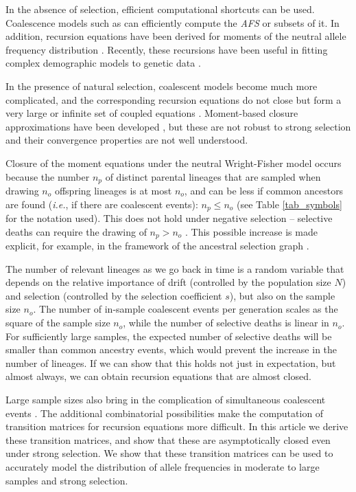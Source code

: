 \documentclass[review]{elsarticle}
\begin{document}
In the absence of selection, efficient computational shortcuts can be used. Coalescence models such
as \citep{fastsimcoal2, KammEtAl2017} can efficiently compute the \textit{AFS} or subsets of it. In
addition, recursion equations have been derived for moments of the neutral allele frequency
distribution \citep{KimuraCrow1964,Ewens1972,JouganousEtAl2017}. Recently, these recursions have
been useful in fitting complex demographic models to genetic data
\citep{JouganousEtAl2017,KammEtAl2017}.
 
In the presence of natural selection, coalescent models become much more complicated, and the
corresponding recursion equations do not close but
form a very large or infinite set of coupled equations \citep{DonnellyKurtz1999, JouganousEtAl2017}. Moment-based closure approximations
have been developed \citep{JouganousEtAl2017}, but these are not robust to strong selection and
their convergence properties are not well understood.

Closure of the moment equations under the neutral Wright-Fisher model occurs because the number $n_p$ of
distinct parental lineages that are sampled when drawing $n_o$ offspring lineages is at most $n_o$,
and can be less if common ancestors are found (\textit{i.e.}, if there are coalescent events): 
$n_p \le n_o$ (see Table \ref{tab_symbols} for the notation used). This does not
hold under negative selection -- selective deaths can require the drawing of $n_p>n_o$  \citep{DonnellyKurtz1999a,
  JouganousEtAl2017}. This possible increase is made explicit, for example, in the framework of the ancestral
selection graph \citep{KroneNeuhauser1997}.

The number of relevant lineages as we go back in time is a random variable that depends on the relative
importance of drift (controlled by the population size $N$) and selection (controlled by the selection coefficient $s$), but also on the sample size $n_o$. 
The number of in-sample coalescent events per generation scales as the square of the sample size $n_o$,
while the number of selective deaths is linear in $n_o$. For sufficiently large
samples, the expected number of selective deaths will be smaller than common ancestry events, which would prevent the
increase in the number of lineages. If we can show that this holds not just in expectation, but almost always,  
we can obtain recursion equations that are almost closed. 
 
Large sample sizes also bring in the complication of simultaneous coalescent events
\citep{BhaskarEtAl2014}. The additional combinatorial possibilities make the computation of
transition matrices for recursion equations more difficult.  In this article we derive these
transition matrices, and show that these are asymptotically closed even under strong selection. We
show that these transition matrices can be used to accurately model the distribution of allele
frequencies in moderate to large samples and strong selection.
\end{document}
